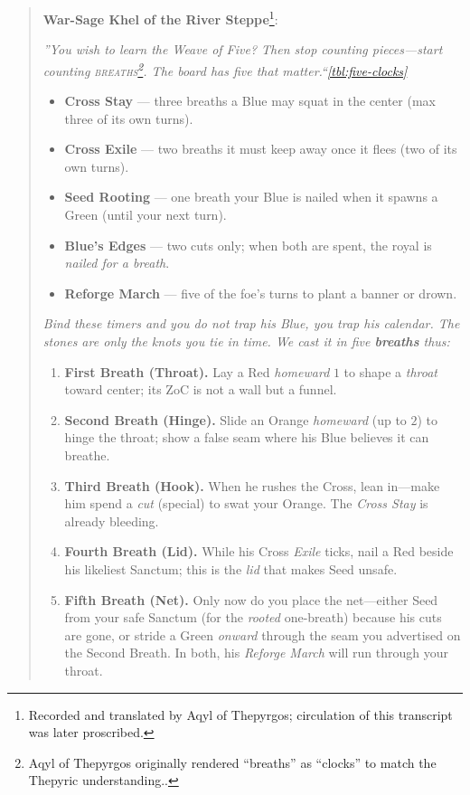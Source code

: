 \documentclass[11pt]{article}
\begin{document}
\begin{quote}\small
\textbf{War-Sage Khel of the River Steppe}\footnote{Recorded and translated by Aqyl of Thepyrgos; circulation of this transcript was later proscribed.}:

\medskip
\emph{''You wish to learn the Weave of Five? Then stop counting pieces---start counting \textsc{breaths}\footnote{Aqyl of Thepyrgos originally rendered ``breaths'' as ``clocks'' to match the Thepyric understanding..}. The board has five that matter.``\ref{tbl:five-clocks}}

\begin{itemize}
  \item \textbf{Cross Stay} --- three breaths a Blue may squat in the center (max three of its own turns).
  \item \textbf{Cross Exile} --- two breaths it must keep away once it flees (two of its own turns).
  \item \textbf{Seed Rooting} --- one breath your Blue is nailed when it spawns a Green (until your next turn).
  \item \textbf{Blue's Edges} --- two cuts only; when both are spent, the royal is \emph{nailed for a breath}.
  \item \textbf{Reforge March} --- five of the foe's turns to plant a banner or drown.
\end{itemize}

\emph{Bind these timers  and you do not trap his Blue, you trap his calendar. The stones are only the knots you tie in time. We cast it in five \textbf{breaths} thus:}

\begin{enumerate}
  \item \textbf{First Breath (Throat).} Lay a Red \emph{homeward} $1$ to shape a \emph{throat} toward center; its ZoC is not a wall but a funnel.
  \item \textbf{Second Breath (Hinge).} Slide an Orange \emph{homeward} (up to $2$) to hinge the throat; show a false seam where his Blue believes it can breathe.
  \item \textbf{Third Breath (Hook).} When he rushes the Cross, lean in---make him spend a \emph{cut} (special) to swat your Orange. The \emph{Cross Stay} is already bleeding.
  \item \textbf{Fourth Breath (Lid).} While his Cross \emph{Exile} ticks, nail a Red beside his likeliest Sanctum; this is the \emph{lid} that makes Seed unsafe.
  \item \textbf{Fifth Breath (Net).} Only now do you place the net---either Seed from your safe Sanctum (for the \emph{rooted} one-breath) because his cuts are gone, or stride a Green \emph{onward} through the seam you advertised on the Second Breath. In both, his \emph{Reforge March} will run through your throat.
\end{enumerate}


\end{quote}
\end{document}
